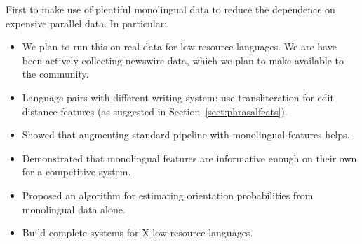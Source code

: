 \documentclass[11pt]{article}
\newcommand{\secref}[1]{Section~\ref{#1}}
\begin{document}
First to make use of plentiful monolingual data to reduce the dependence on expensive parallel data.  In particular:

\begin{itemize}
\item We plan to run this on real data for low resource languages.  We are have been actively collecting newswire data, which we plan to make available to the community.
\item Language pairs with different writing system: use transliteration for edit distance features (as suggested in \secref{sect:phrasalfeats}).
\item Showed that augmenting standard pipeline with monolingual features helps.
\item Demonstrated that monolingual features are informative enough on their own for a competitive system.
\item Proposed an algorithm for estimating orientation probabilities from monolingual data alone.
\item Build complete systems for X low-resource languages.
\end{itemize}




\end{document}
